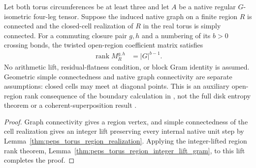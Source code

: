 \begin{lemma}%
    \label{thm:peps_torus_simply_connected_region_rank}
    \leanok
    Let both torus circumferences be at least three and let $A$ be a
    native regular $G$-isometric four-leg tensor. Suppose the induced
    native graph on a finite region $R$ is connected and the
    closed-cell realization of $R$ in the real torus is simply connected.
    For a commuting closure pair $g,h$ and a numbering of its $b>0$
    crossing bonds, the twisted open-region coefficient matrix satisfies
    \begin{align}
        \operatorname{rank}M_R^{g,h} & =|G|^{b-1}.
    \end{align}
    No arithmetic lift, residual-flatness condition, or block Gram
    identity is assumed. Geometric simple connectedness and native
    graph connectivity are separate assumptions: closed cells may
    meet at diagonal points. This is an auxiliary open-region rank
    consequence of the boundary calculation in
    \cite[Theorem~6.9]{Schuch2010PEPS}, not the full disk entropy theorem
    or a coherent-superposition result
    \cite{gap:rmp_peps_quantum_double_g_isometry}.
\end{lemma}

\begin{proof}\leanok
    Graph connectivity gives a region vertex, and simple connectedness
    of the cell realization gives an integer lift preserving
    every internal native unit step by
    Lemma~\ref{thm:peps_torus_region_realization}. Applying the
    integer-lifted region rank theorem,
    Lemma~\ref{thm:peps_torus_region_integer_lift_gram}, to this lift completes the proof.
\end{proof}

